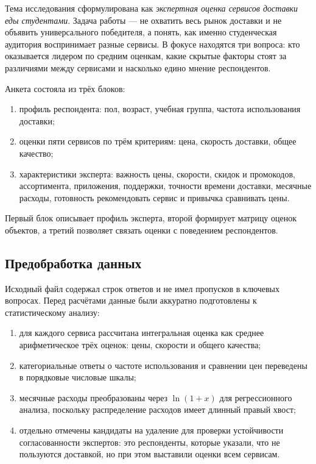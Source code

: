 \documentclass[14pt,a4paper]{extarticle}
\begin{document}
Тема исследования сформулирована как \textit{экспертная оценка сервисов доставки еды студентами}. Задача работы — не охватить весь рынок доставки и не объявить универсального победителя, а понять, как именно студенческая аудитория воспринимает разные сервисы. В фокусе находятся три вопроса: кто оказывается лидером по средним оценкам, какие скрытые факторы стоят за различиями между сервисами и насколько едино мнение респондентов.

Анкета состояла из трёх блоков:
\begin{enumerate}[leftmargin=1.25cm]
    \item профиль респондента: пол, возраст, учебная группа, частота использования доставки;
    \item оценки пяти сервисов по трём критериям: цена, скорость доставки, общее качество;
    \item характеристики эксперта: важность цены, скорости, скидок и промокодов, ассортимента, приложения, поддержки, точности времени доставки, месячные расходы, готовность рекомендовать сервис и привычка сравнивать цены.
\end{enumerate}

Первый блок описывает профиль эксперта, второй формирует матрицу оценок объектов, а третий позволяет связать оценки с поведением респондентов.

\subsection{Предобработка данных}

Исходный файл содержал \NRespondents{} строк ответов и не имел пропусков в ключевых вопросах. Перед расчётами данные были аккуратно подготовлены к статистическому анализу:
\begin{enumerate}[leftmargin=1.25cm]
    \item для каждого сервиса рассчитана интегральная оценка как среднее арифметическое трёх оценок: цены, скорости и общего качества;
    \item категориальные ответы о частоте использования и сравнении цен переведены в порядковые числовые шкалы;
    \item месячные расходы преобразованы через $\ln(1+x)$ для регрессионного анализа, поскольку распределение расходов имеет длинный правый хвост;
    \item отдельно отмечены кандидаты на удаление для проверки устойчивости согласованности экспертов: это респонденты, которые указали, что не пользуются доставкой, но при этом выставили оценки всем сервисам.
\end{enumerate}
\end{document}
